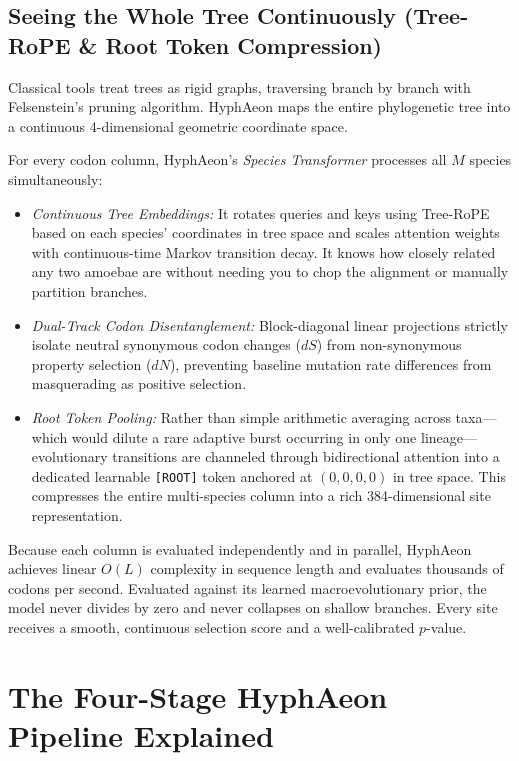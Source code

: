 \documentclass[11pt,a4paper]{article}
\begin{document}
\subsection{Seeing the Whole Tree Continuously (Tree-RoPE \& Root Token Compression)}
Classical tools treat trees as rigid graphs, traversing branch by branch with Felsenstein's pruning algorithm. HyphAeon maps the entire phylogenetic tree into a continuous 4-dimensional geometric coordinate space. 

For every codon column, HyphAeon's \textit{Species Transformer} processes all $M$ species simultaneously:
\begin{itemize}
    \item \textit{Continuous Tree Embeddings:} It rotates queries and keys using Tree-RoPE based on each species' coordinates in tree space and scales attention weights with continuous-time Markov transition decay. It knows how closely related any two amoebae are without needing you to chop the alignment or manually partition branches.
    \item \textit{Dual-Track Codon Disentanglement:} Block-diagonal linear projections strictly isolate neutral synonymous codon changes ($dS$) from non-synonymous property selection ($dN$), preventing baseline mutation rate differences from masquerading as positive selection.
    \item \textit{Root Token Pooling:} Rather than simple arithmetic averaging across taxa---which would dilute a rare adaptive burst occurring in only one lineage---evolutionary transitions are channeled through bidirectional attention into a dedicated learnable \texttt{[ROOT]} token anchored at $(0,0,0,0)$ in tree space. This compresses the entire multi-species column into a rich 384-dimensional site representation.
\end{itemize}

Because each column is evaluated independently and in parallel, HyphAeon achieves linear $O(L)$ complexity in sequence length and evaluates thousands of codons per second. Evaluated against its learned macroevolutionary prior, the model never divides by zero and never collapses on shallow branches. Every site receives a smooth, continuous selection score and a well-calibrated $p$-value.

\section{The Four-Stage HyphAeon Pipeline Explained}
\end{document}
